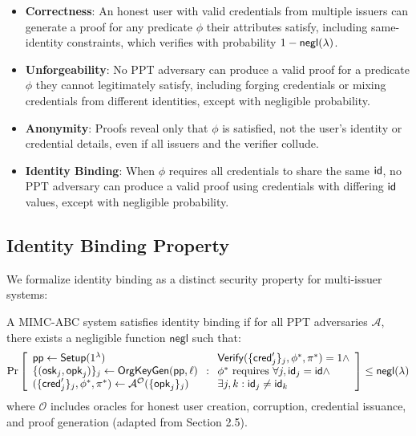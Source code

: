 \begin{itemize}
    \item \textbf{Correctness}: An honest user with valid credentials from multiple issuers can generate a proof for any predicate $\phi$ their attributes satisfy, including same-identity constraints, which verifies with probability $1 - \mathsf{negl}(\lambda)$.
    
    \item \textbf{Unforgeability}: No PPT adversary can produce a valid proof for a predicate $\phi$ they cannot legitimately satisfy, including forging credentials or mixing credentials from different identities, except with negligible probability.
    
    \item \textbf{Anonymity}: Proofs reveal only that $\phi$ is satisfied, not the user’s identity or credential details, even if all issuers and the verifier collude.
    
    \item \textbf{Identity Binding}: When $\phi$ requires all credentials to share the same $\mathsf{id}$, no PPT adversary can produce a valid proof using credentials with differing $\mathsf{id}$ values, except with negligible probability.
\end{itemize}

\subsection{Identity Binding Property}

We formalize identity binding as a distinct security property for multi-issuer systems:



\begin{definition}
A MIMC-ABC system satisfies identity binding if for all PPT adversaries $\mathcal{A}$, there exists a negligible function $\mathsf{negl}$ such that:
\[
\Pr\left[
\begin{array}{l}
    \mathsf{pp} \gets \mathsf{Setup}(1^\lambda) \\
    \{(\mathsf{osk}_j, \mathsf{opk}_j)\}_j \gets \mathsf{OrgKeyGen}(\mathsf{pp}, \ell) \\
    (\{\mathsf{cred}_j'\}_j, \phi^*, \pi^*) \gets \mathcal{A}^{\mathcal{O}}(\{\mathsf{opk}_j\}_j)
\end{array}
: \begin{array}{l}
    \mathsf{Verify}(\{\mathsf{cred}_j'\}_j, \phi^*, \pi^*) = 1 \land \\
    \phi^* \text{ requires } \forall j, \mathsf{id}_j = \mathsf{id} \land \\
    \exists j, k: \mathsf{id}_j \neq \mathsf{id}_k
\end{array}
\right] \leq \mathsf{negl}(\lambda)
\]
where $\mathcal{O}$ includes oracles for honest user creation, corruption, credential issuance, and proof generation (adapted from Section 2.5).
\end{definition}

